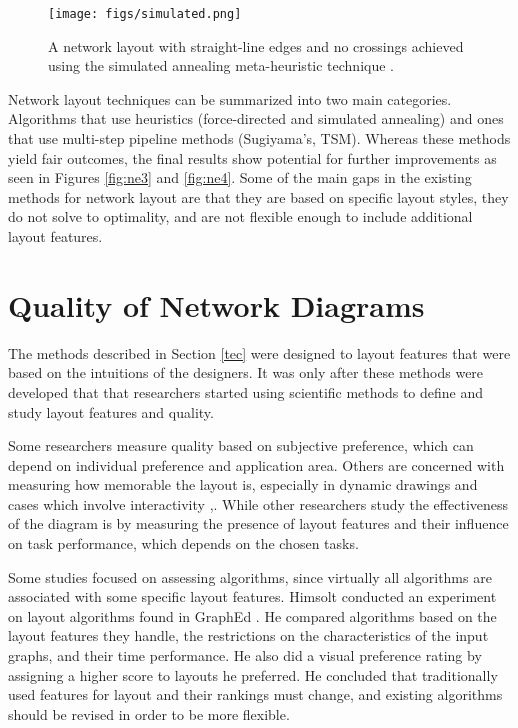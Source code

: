 \documentclass[a4paper,11pt,phdthesis,singlespace,twoside]{cssethesis}
\begin{document}
\begin{figure}[H]
\begin{center}
\texttt{[image: figs/simulated.png]}
\end{center}
\caption{A network layout with straight-line edges and no crossings achieved using the simulated annealing meta-heuristic technique \cite{davidson1996drawing}.}
\label{fig:simulated}
\end{figure}
 
Network layout techniques can be summarized into two main categories. Algorithms that use heuristics (force-directed and simulated annealing) and ones that use multi-step pipeline methods (Sugiyama's, TSM). Whereas these methods yield fair outcomes, the final results show potential for further improvements as seen in Figures \ref{fig:ne3} and \ref{fig:ne4}. Some of the main gaps in the existing methods for network layout are that they are based on specific layout styles, they do not solve to optimality, and are not flexible enough to include additional layout features.

\section{Quality of Network Diagrams} \label{aes}

The methods described in Section \ref{tec} were designed to layout features that were based on the intuitions of the designers. It was only after these methods were developed that that researchers started using scientific methods to define and study layout features and quality.

Some researchers measure quality based on subjective preference, which can depend on individual preference and application area. Others are concerned with measuring how memorable the layout is, especially in dynamic drawings and cases which involve interactivity \cite{bridgeman1998difference},\cite{marriott2012memorability}. While other researchers study the effectiveness of the diagram is by measuring the presence of layout features and their influence on task performance, which depends on the chosen tasks.

Some studies focused on assessing algorithms, since virtually all algorithms are associated with some specific layout features. Himsolt conducted an experiment on layout algorithms found in GraphEd \cite{himsolt1995comparing}. He compared algorithms based on the layout features they handle, the restrictions on the characteristics of the input graphs, and their time performance. He also did a visual preference rating by assigning a higher score to layouts he preferred. He concluded that traditionally used features for layout and their rankings must change, and existing algorithms should be revised in order to be more flexible.
\end{document}
